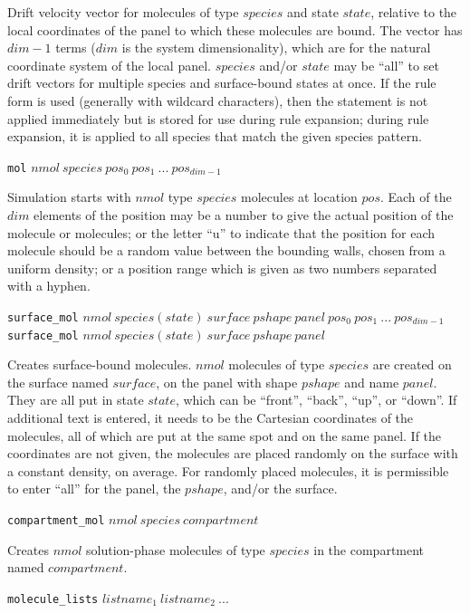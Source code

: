 \documentclass {scrbook}
\newcommand {\ttt} {\texttt}
\begin{document}
\begin{description}
Drift velocity vector for molecules of type $species$ and state $state$, relative to the local coordinates of the panel to which these molecules are bound. The vector has $dim-1$ terms ($dim$ is the system dimensionality), which are for the natural coordinate system of the local panel. $species$ and/or $state$ may be ``all'' to set drift vectors for multiple species and surface-bound states at once. If the rule form is used (generally with wildcard characters), then the statement is not applied immediately but is stored for use during rule expansion; during rule expansion, it is applied to all species that match the given species pattern.

\item{\ttt{mol} $nmol\ species\ pos_0\ pos_1\ ...\ pos_{dim-1}$}

Simulation starts with $nmol$ type $species$ molecules at location $pos$. Each of the $dim$ elements of the position may be a number to give the actual position of the molecule or molecules; or the letter ``u'' to indicate that the position for each molecule should be a random value between the bounding walls, chosen from a uniform density; or a position range which is given as two numbers separated with a hyphen.

\item{\ttt{surface\_mol} $nmol\ species(state)\ surface\ pshape\ panel\ pos_0\ pos_1\ ...\ pos_{dim-1}$\\
\ttt{surface\_mol} $nmol\ species(state)\ surface\ pshape\ panel$}

Creates surface-bound molecules. $nmol$ molecules of type $species$ are created on the surface named $surface$, on the panel with shape $pshape$ and name $panel$. They are all put in state $state$, which can be ``front'', ``back'', ``up'', or ``down''. If additional text is entered, it needs to be the Cartesian coordinates of the molecules, all of which are put at the same spot and on the same panel. If the coordinates are not given, the molecules are placed randomly on the surface with a constant density, on average. For randomly placed molecules, it is permissible to enter ``all'' for the panel, the $pshape$, and/or the surface.

\item{\ttt{compartment\_mol} $nmol\ species\ compartment$}

Creates $nmol$ solution-phase molecules of type $species$ in the compartment named $compartment$.

\item{\ttt{molecule\_lists} $listname_1\ listname_2\ ...$}


\end{description}
\end{document}

